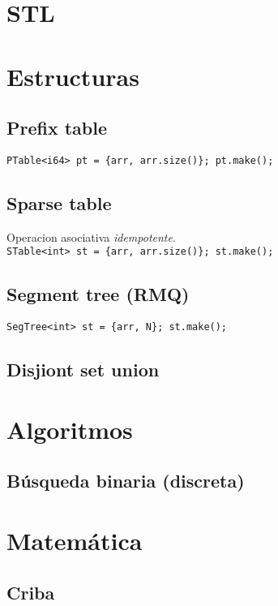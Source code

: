 

\def\title{Notebook (largo)}
\tableofcontents\newpage
 
\section{STL}
    

\section{Estructuras}
    \subsection{Prefix table}
        \texttt{PTable<i64> pt = \{arr, arr.size()\}; pt.make();}
    \subsection{Sparse table}
    Operacion asociativa \emph{idempotente}. \\
    \texttt{STable<int> st = \{arr, arr.size()\}; st.make();}
    \subsection{Segment tree (RMQ)}
        \texttt{SegTree<int> st = \{arr, N\}; st.make();}
    \subsection{Disjiont set union}

\section{Algoritmos}
    \subsection{Búsqueda binaria (discreta)}

\section{Matemática}
    \subsection{Criba}

